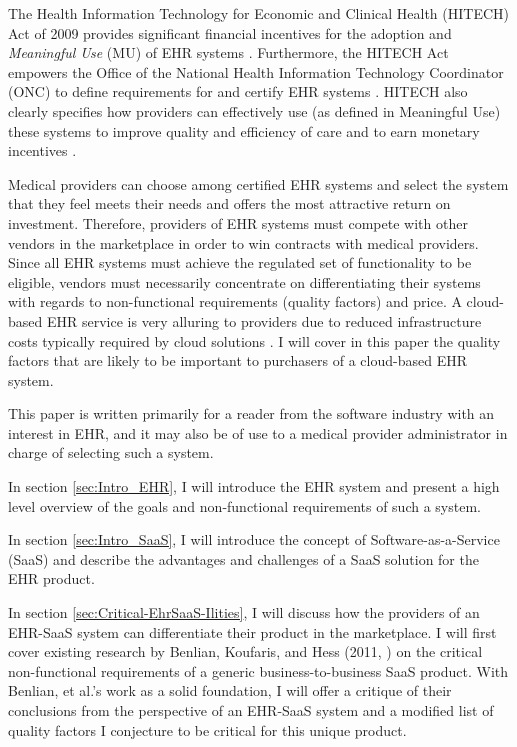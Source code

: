 \documentclass[10pt]{article}
\begin{document}
The Health Information Technology for Economic and Clinical Health (HITECH) Act of 2009 provides significant financial incentives for the adoption and \textit{Meaningful Use} (MU) of EHR systems \cite{ehrbook}.
Furthermore, the HITECH Act empowers the Office of the National Health Information Technology Coordinator (ONC) to define requirements for and certify EHR systems \cite{onc-ehr}.
HITECH also clearly specifies how providers can effectively use (as defined in Meaningful Use) these systems to improve quality and efficiency of care and to earn monetary incentives \cite{ehrbook}.

Medical providers can choose among certified EHR systems and select the system that they feel meets their needs and offers the most attractive return on investment.
Therefore, providers of EHR systems must compete with other vendors in the marketplace in order to win contracts with medical providers.
Since all EHR systems must achieve the regulated set of functionality to be eligible, vendors must necessarily concentrate on differentiating their systems with regards to non-functional requirements (quality factors) and price.
A cloud-based EHR service is very alluring to providers due to reduced infrastructure costs typically required by cloud solutions \cite{auditingprivacy}.
I will cover in this paper the quality factors that are likely to be important to purchasers of a cloud-based EHR system.

This paper is written primarily for a reader from the software industry with an interest in EHR, and it may also be of use to a medical provider administrator in charge of selecting such a system.

In section \ref{sec:Intro_EHR}, I will introduce the EHR system and present a high level overview of the goals and non-functional requirements of such a system.

In section \ref{sec:Intro_SaaS}, I will introduce the concept of Software-as-a-Service (SaaS) and describe the advantages and challenges of a SaaS solution for the EHR product.

In section \ref{sec:Critical-EhrSaaS-Ilities}, I will discuss how the providers of an EHR-SaaS system can differentiate their product in the marketplace. 
I will first cover existing research by Benlian, Koufaris, and Hess (2011, \cite{saasqual}) on the critical non-functional requirements of a generic business-to-business SaaS product.
With Benlian, et al.'s work as a solid foundation, I will offer a critique of their conclusions from the perspective of an EHR-SaaS system and a modified list of quality factors I conjecture to be critical for this unique product.
\end{document}
